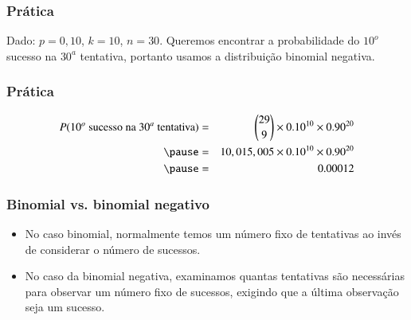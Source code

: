 
\begin{frame}
\frametitle{Prática}
\justifying
{}

\pause
\justifying
Dado: $ p = 0,10 $, $ k = 10 $, $ n = 30 $. Queremos encontrar a probabilidade do $ 10 ^ {o} $ sucesso na $ 30 ^ {a} $ tentativa, portanto usamos a distribuição binomial negativa.

\pause
\end{frame}

\begin{frame}
\frametitle{Prática}

\begin{eqnarray*}
P(\text{$10^{o}$ sucesso na $30^{a}$ tentativa}) &=& {29 \choose 9} \times 0.10^{10} \times 0.90^{20} \\
\pause
&=& 10,015,005 \times 0.10^{10} \times 0.90^{20} \\
\pause
&=& 0.00012
\end{eqnarray*}

\end{frame}


\begin{frame}
\frametitle{Binomial vs. binomial negativo}
\justifying
{}

\pause

\begin{itemize}
\justifying
\item No caso binomial, normalmente temos um número fixo de tentativas ao invés de considerar o número de sucessos.
\justifying
\item No caso da binomial negativa, examinamos quantas tentativas são necessárias para observar um número fixo de sucessos, exigindo que a última observação seja um sucesso.

\end{itemize}

\end{frame}

